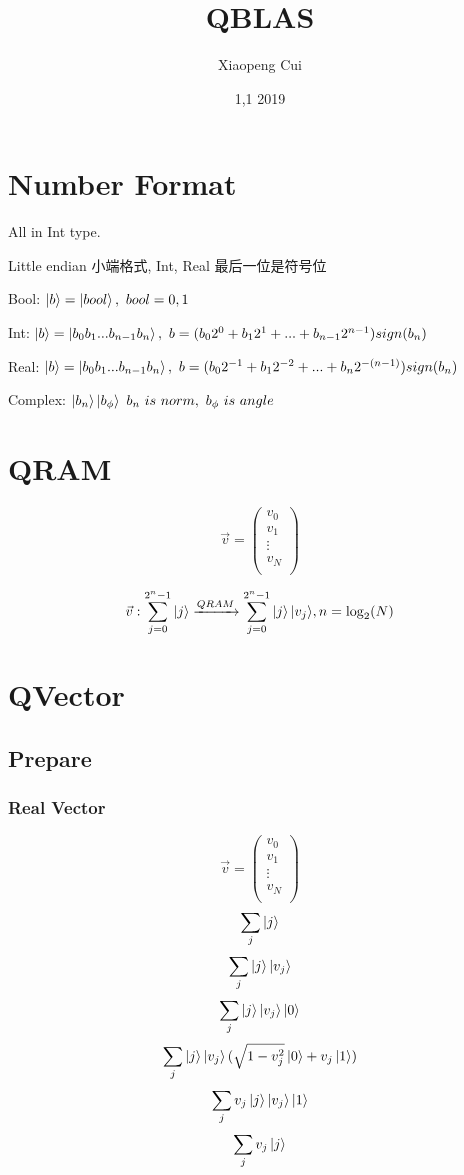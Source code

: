 \documentclass{article}
\begin{document}
\title{QBLAS}
\author{Xiaopeng Cui}
\date{1,1 2019}
\maketitle
\tableofcontents
\section{Number Format}
All in Int type.

Little endian 小端格式, Int, Real 最后一位是符号位

Bool: $ \ket{b} = \ket{bool},\ bool=0,1 $

Int: $ \ket{b} = \ket{b_0b_1...b_{n-1}b_n},	\  b= (b_0 2^0 + b_1 2^1+ ... + b_{n-1} 2^{n-1}) sign(b_n)  $

Real: $ \ket{b} = \ket{b_0b_1...b_{n-1}b_n},\ 	 b= (b_0 2^{-1} + b_1 2^{-2}+ ... + b_n 2^{-(n-1)} ) sign(b_n)  $

Complex: $ \ket{b_n}\ket{b_\phi} \ 	b_n\  is\  norm,\  b_\phi \  is\  angle $


\section{QRAM}
$$ \vec{v} =\left(
\begin{array}{c}
v_0 \\
v_1 \\
\vdots \\
v_N \\
\end{array}
\right) $$

$$ \vec{v}:		\sum_{ j=0 }^{ 2^n-1 } { \ket{j}}	\xrightarrow{QRAM}		\sum_{ j=0 }^{2^n-1} { \ket{j} \ket{v_j} },	n=\log_2(N)	$$	

\section{QVector}
\subsection{Prepare}
\subsubsection{ Real Vector}
$$ \vec{v} =\left(
\begin{array}{c}
v_0 \\
v_1 \\
\vdots \\
v_N \\
\end{array}
\right) $$
$$ \sum_j{ \ket{j} } $$
$$  \sum_j{\ket{j}\ket{v_j}} $$
$$  \sum_j{\ket{j}\ket{v_j} \ket{0} } $$
$$  \sum_j{\ket{j}\ket{v_j} ( \sqrt{1-v_j^2} \ket{0} + v_j\ket{1}) } $$
$$  \sum_j{v_j\ket{j}\ket{v_j}\ket{1} } $$
$$  \sum_j{v_j\ket{j} } $$
\end{document}
